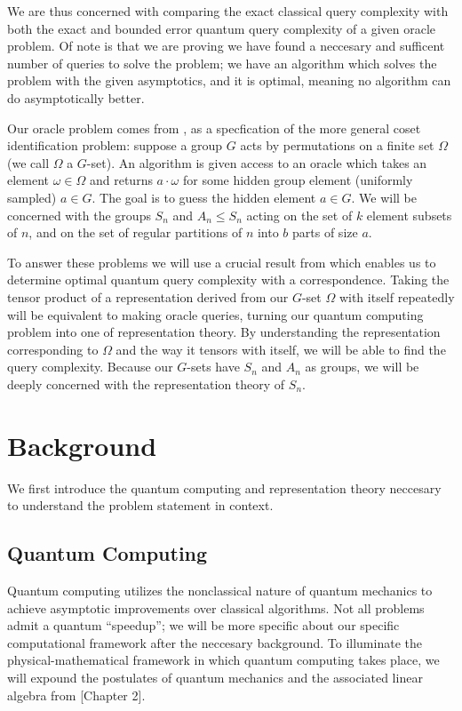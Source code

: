 \documentclass[12pt,twoside]{reedthesis}
\theoremstyle{plain}   %
\theoremstyle{definition}
\theoremstyle{remark}
\numberwithin{equation}{section}
\begin{document}
  We are thus concerned with comparing the exact classical query complexity with both the exact and bounded error quantum query complexity of a given oracle problem.
  Of note is that we are proving we have found a neccesary and sufficent number of queries to solve the problem; we have an algorithm which solves the problem with the given asymptotics, and it is optimal,
  meaning no algorithm can do asymptotically better.
  \par
  Our oracle problem comes from \cite{copeland}, as a specfication of the more general coset identification problem:
  suppose a group $G$ acts by permutations on a finite set $\Omega$ (we call $\Omega$ a $G$-set).
  An algorithm is given access to an oracle which takes an element $\omega \in \Omega$ and returns $a \cdot \omega$ for some hidden group element (uniformly sampled) $a \in G$. The goal is to guess
  the hidden element $a \in G$.
  We will be concerned with the groups $S_n$ and $A_n \leq S_n$ acting on the set of $k$ element subsets of $n$, and on the set of regular partitions of $n$ into $b$ parts of size $a$.
  \par
  To answer these problems we will use a crucial result from \cite{copeland} which enables us to determine optimal quantum query complexity with a correspondence.
  Taking the tensor product of a representation derived from our $G$-set $\Omega$ with itself repeatedly will be equivalent to making oracle queries, turning our quantum computing problem
  into one of representation theory.
  By understanding the representation corresponding to $\Omega$ and the way it tensors with itself, we will be able to find the query complexity.
  Because our $G$-sets have $S_n$ and $A_n$ as groups, we will be deeply concerned with the representation theory of $S_n$.
  
  
  \chapter{Background}
  We first introduce the quantum computing and representation theory neccesary to understand the problem statement in context.
  \section{Quantum Computing}
  Quantum computing utilizes the nonclassical nature of quantum mechanics to achieve asymptotic improvements over classical algorithms.
  Not all problems admit a quantum ``speedup''; we will be more specific about our specific computational framework after the neccesary background.
  To illuminate the physical-mathematical framework in which quantum computing takes place, we will expound the postulates of quantum mechanics and the associated linear algebra from \cite{nielsen2010}[Chapter 2].
\end{document}
